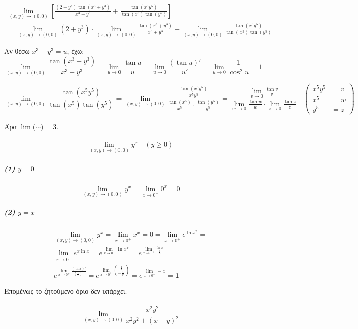 \documentclass[11pt,a4paper,titlepage]{article}
\begin{document}
\paragraph{}
\begin{gather*}
\lim_{(x,y)\to (0,0)}
\left[
\frac{(2+y^3)\tan (x^3+y^3)}{x^3+y^3} +
\frac{\tan(x^5y^5)}{\tan(x^5)\tan(y^5)}
\right]
=\\
=
\lim_{(x,y)\to (0,0)} (2+y^3) \cdot
\lim_{(x,y)\to (0,0)} \frac{\tan(x^3+y^3)}{x^3+y^3} +
\lim_{(x,y)\to (0,0)} \frac{\tan(x^5y^5)}{\tan(x^5) \tan(y^5)}
\end{gather*}

Αν θέσω \(x^3+y^3=u\), έχω:
\[
\lim_{(x,y)\to (0,0)} \frac{\tan(x^3+y^3)}{x^3+y^3}
= \lim_{u\to 0} \frac{\tan u}{u} =
\lim_{u\to 0} \frac{(\tan u)'}{u'} =
\lim_{u \to 0} \frac{1}{\cos^2 u} = 1
\]

\[
\lim_{(x,y)\to (0,0)} \frac{\tan(x^5y^5)}{\tan(x^5) \tan(y^5)}
=
\lim_{(x,y)\to (0,0)} \frac{\frac{\tan(x^5y^5)}{x^5y^5}}{\frac{\tan(x^5)}{x^5}\cdot\frac{\tan(y^5)}{y^5}}
=
\frac{
\lim_{v\to 0} \frac{\tan v}{v}
}{
\lim_{w\to 0} \frac{\tan w}{w}
\cdot
\lim_{z\to 0} \frac{\tan z}{z}
}
\quad
\left(
\begin{matrix}
x^5y^5 &=v\\
x^5 &=w\\
y^5 &=z
\end{matrix}
\right)
\]

Άρα \(\lim \bigg( \cdots \bigg) = 3\).

\paragraph{}
\[
\lim_{(x,y) \to (0,0)} y^x \quad (y \geq 0)
\]
\subparagraph{(1) \(y=0\)}
\[
\lim_{(x,y)\to(0,0)}y^x=
\lim_{x\to 0^+} 0^x = 0
\]
\subparagraph{(2) \(y=x\)}
\begin{gather*}
\lim_{(x,y)\to(0,0)}y^x=
\lim_{x\to 0^+} x^x = 0 =
\lim_{x\to 0^+} e^{\ln x^x} = \\
\lim_{x\to 0^+} e^{x\ln x} =
e^{\lim_{x\to 0^+} \ln x^x} =
e^{\lim_{x\to 0^+} \frac{\ln x}{\frac{1}{x}}} = \\
e^{\lim_{x\to 0^+} \frac{(\ln x)'}{\left(\frac{1}{x}\right) ' }} =
e^{\lim_{x\to 0^+} \left( \frac{\frac{1}{x}}{-\frac{1}{x^2}} \right)} =
e^{\lim_{x\to 0^+} -x} = \mathbf 1
\end{gather*}

Επομένως το ζητούμενο όριο δεν υπάρχει.

\paragraph{}
\[
\lim_{(x,y) \to(0,0)} \frac{x^2y^2}{x^2y^2+(x-y)^2}
\]
\end{document}
